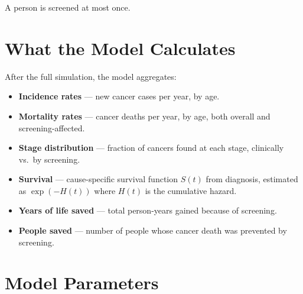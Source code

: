 \documentclass[12pt,a4paper]{article}
\begin{document}
A person is screened at most once.

\section{What the Model Calculates}

After the full simulation, the model aggregates:

\begin{itemize}[nosep]
    \item \textbf{Incidence rates} --- new cancer cases per year, by age.
    \item \textbf{Mortality rates} --- cancer deaths per year, by age, both overall and screening-affected.
    \item \textbf{Stage distribution} --- fraction of cancers found at each stage, clinically vs.\ by screening.
    \item \textbf{Survival} --- cause-specific survival function $S(t)$ from diagnosis, estimated as $\exp(-H(t))$ where $H(t)$ is the cumulative hazard.
    \item \textbf{Years of life saved} --- total person-years gained because of screening.
    \item \textbf{People saved} --- number of people whose cancer death was prevented by screening.
\end{itemize}

\section{Model Parameters}
\end{document}
